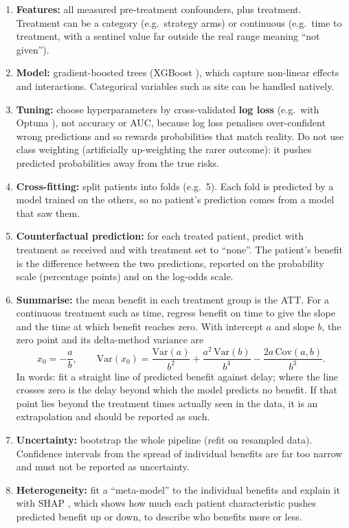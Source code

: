 \begin{enumerate}
\item \textbf{Features:} all measured pre-treatment confounders, plus treatment. Treatment can be a category (e.g.\ strategy arms) or continuous (e.g.\ time to treatment, with a sentinel value far outside the real range meaning ``not given'').
\item \textbf{Model:} gradient-boosted trees (XGBoost \cite{chen2016xgboost}), which capture non-linear effects and interactions. Categorical variables such as site can be handled natively.
\item \textbf{Tuning:} choose hyperparameters by cross-validated \textbf{log loss} (e.g.\ with Optuna \cite{akiba2019optuna}), not accuracy or AUC, because log loss penalises over-confident wrong predictions and so rewards probabilities that match reality. Do not use class weighting (artificially up-weighting the rarer outcome): it pushes predicted probabilities away from the true risks.
\item \textbf{Cross-fitting:} split patients into folds (e.g.\ 5). Each fold is predicted by a model trained on the others, so no patient's prediction comes from a model that saw them.
\item \textbf{Counterfactual prediction:} for each treated patient, predict with treatment as received and with treatment set to ``none''. The patient's benefit is the difference between the two predictions, reported on the probability scale (percentage points) and on the log-odds scale.
\item \textbf{Summarise:} the mean benefit in each treatment group is the ATT. For a continuous treatment such as time, regress benefit on time to give the slope and the time at which benefit reaches zero. With intercept $a$ and slope $b$, the zero point and its delta-method variance are
\[ x_0 = -\frac{a}{b}, \qquad \mathrm{Var}(x_0) = \frac{\mathrm{Var}(a)}{b^2} + \frac{a^2\,\mathrm{Var}(b)}{b^4} - \frac{2a\,\mathrm{Cov}(a,b)}{b^3}. \]
In words: fit a straight line of predicted benefit against delay; where the line crosses zero is the delay beyond which the model predicts no benefit. If that point lies beyond the treatment times actually seen in the data, it is an extrapolation and should be reported as such.
\item \textbf{Uncertainty:} bootstrap the whole pipeline (refit on resampled data). Confidence intervals from the spread of individual benefits are far too narrow and must not be reported as uncertainty.
\item \textbf{Heterogeneity:} fit a ``meta-model'' to the individual benefits and explain it with SHAP \cite{lundberg2017shap}, which shows how much each patient characteristic pushes predicted benefit up or down, to describe who benefits more or less.
\end{enumerate}

